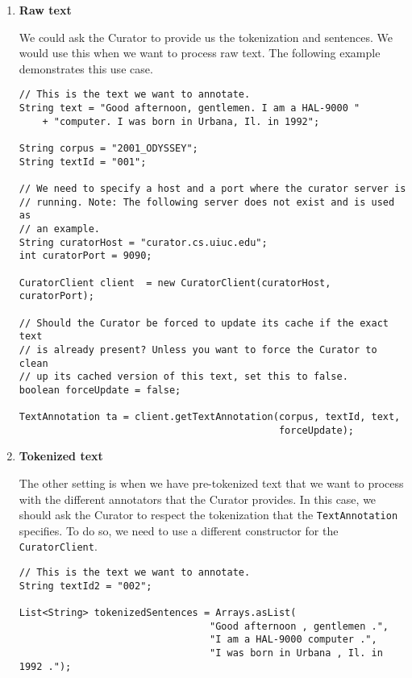 \documentclass[11pt]{article}
\begin{document}
\begin{enumerate}
\item \textbf{Raw text}
      
      We could ask the Curator to provide us the tokenization and
      sentences. We would use this when we want to process raw
      text. The following example demonstrates this use case.
      

\lstset{frame=lines,basicstyle=\footnotesize,numbers=left,captionpos=b,showstringspaces=false,numberstyle=\tiny,language=java}
\begin{lstlisting}
// This is the text we want to annotate.
String text = "Good afternoon, gentlemen. I am a HAL-9000 "
    + "computer. I was born in Urbana, Il. in 1992";

String corpus = "2001_ODYSSEY";
String textId = "001";

// We need to specify a host and a port where the curator server is
// running. Note: The following server does not exist and is used as
// an example. 
String curatorHost = "curator.cs.uiuc.edu";
int curatorPort = 9090;

CuratorClient client  = new CuratorClient(curatorHost, curatorPort);

// Should the Curator be forced to update its cache if the exact text
// is already present? Unless you want to force the Curator to clean
// up its cached version of this text, set this to false.
boolean forceUpdate = false;

TextAnnotation ta = client.getTextAnnotation(corpus, textId, text,
                                             forceUpdate);
\end{lstlisting}
\item \textbf{Tokenized text}

      The other setting is when we have pre-tokenized text that we
      want to process with the different annotators that the Curator
      provides. In this case, we should ask the Curator to respect the
      tokenization that the \texttt{TextAnnotation} specifies. To do so, we
      need to use a different constructor for the \texttt{CuratorClient}.


\lstset{frame=lines,basicstyle=\footnotesize,numbers=left,captionpos=b,showstringspaces=false,numberstyle=\tiny,language=java}
\begin{lstlisting}
// This is the text we want to annotate.
String textId2 = "002";

List<String> tokenizedSentences = Arrays.asList(
                                 "Good afternoon , gentlemen .", 
                                 "I am a HAL-9000 computer .",
                                 "I was born in Urbana , Il. in 1992 .");


\end{lstlisting}
\end{enumerate}
\end{document}
